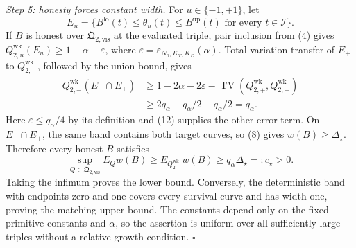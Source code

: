 \emph{Step 5: honesty forces constant width.}
For \(u\in\{-1,+1\}\), let
\[
 E_u=\{B^{\mathrm{lo}}(t)\le\theta_u(t)\le B^{\mathrm{up}}(t)
       \text{ for every }t\in\mathcal I\}.
\]
If \(B\) is honest over \(\mathfrak Q_{2,\mathrm{vis}}\) at the evaluated
triple, pair inclusion from (4) gives
\(Q_{2,u}^{\mathrm{wk}}(E_u)\ge1-\alpha-\varepsilon\), where
\(\varepsilon=\varepsilon_{N_0,K_T,K_D}(\alpha)\).
Total-variation transfer of \(E_+\) to
\(Q_{2,-}^{\mathrm{wk}}\), followed by the union bound, gives
\[
 \begin{aligned}
 Q_{2,-}^{\mathrm{wk}}(E_-\cap E_+)
 &\ge1-2\alpha-2\varepsilon
      -\operatorname{TV}(Q_{2,+}^{\mathrm{wk}},Q_{2,-}^{\mathrm{wk}})\\
 &\ge2q_\alpha-q_\alpha/2-q_\alpha/2=q_\alpha.        \tag{13}
 \end{aligned}
\]
Here \(\varepsilon\le q_\alpha/4\) by its definition and (12) supplies
the other error term.  On \(E_-\cap E_+\), the same band contains both
target curves, so (8) gives \(w(B)\ge\Delta_\star\).  Therefore every
honest \(B\) satisfies
\[
 \sup_{Q\in\mathfrak Q_{2,\mathrm{vis}}}E_Qw(B)
 \ge E_{Q_{2,-}^{\mathrm{wk}}}w(B)
 \ge q_\alpha\Delta_\star=:c_\star>0.                 \tag{14}
\]
Taking the infimum proves the lower bound.  Conversely, the deterministic
band with endpoints zero and one covers every survival curve and has width
one, proving the matching upper bound.  The constants depend only on the
fixed primitive constants and \(\alpha\), so the assertion is uniform over
all sufficiently large triples without a relative-growth condition.
\(\square\)